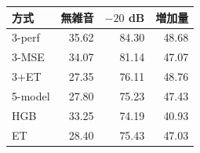 \begin{tabular}{lrrr}
\toprule
方式 & 無雑音 & $-20$ dB & 増加量 \\
\midrule
3-perf & 35.62 & 84.30 & 48.68 \\
3-MSE & 34.07 & 81.14 & 47.07 \\
3+ET & 27.35 & 76.11 & 48.76 \\
5-model & 27.80 & 75.23 & 47.43 \\
HGB & 33.25 & 74.19 & 40.93 \\
ET & 28.40 & 75.43 & 47.03 \\
\bottomrule
\end{tabular}
